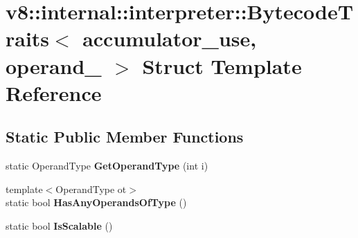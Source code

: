 \hypertarget{structv8_1_1internal_1_1interpreter_1_1_bytecode_traits_3_01accumulator__use_00_01operand__0_01_4}{}\section{v8\+:\+:internal\+:\+:interpreter\+:\+:Bytecode\+Traits$<$ accumulator\+\_\+use, operand\+\_ $>$ Struct Template Reference}
\label{structv8_1_1internal_1_1interpreter_1_1_bytecode_traits_3_01accumulator__use_00_01operand__0_01_4}
\subsection*{Static Public Member Functions}
\begin{DoxyCompactItemize}
\item 
static Operand\+Type {\bfseries Get\+Operand\+Type} (int i)\hypertarget{structv8_1_1internal_1_1interpreter_1_1_bytecode_traits_3_01accumulator__use_00_01operand__0_01_4_a90b60251aa2a39b26f923ed2ba91f692}{}\label{structv8_1_1internal_1_1interpreter_1_1_bytecode_traits_3_01accumulator__use_00_01operand__0_01_4_a90b60251aa2a39b26f923ed2ba91f692}

\item 
{\footnotesize template$<$Operand\+Type ot$>$ }\\static bool {\bfseries Has\+Any\+Operands\+Of\+Type} ()\hypertarget{structv8_1_1internal_1_1interpreter_1_1_bytecode_traits_3_01accumulator__use_00_01operand__0_01_4_ae061e6417d1d085d25716c213a7ae28f}{}\label{structv8_1_1internal_1_1interpreter_1_1_bytecode_traits_3_01accumulator__use_00_01operand__0_01_4_ae061e6417d1d085d25716c213a7ae28f}

\item 
static bool {\bfseries Is\+Scalable} ()\hypertarget{structv8_1_1internal_1_1interpreter_1_1_bytecode_traits_3_01accumulator__use_00_01operand__0_01_4_a4e12934658dee00e5b6d256c499ae02e}{}\label{structv8_1_1internal_1_1interpreter_1_1_bytecode_traits_3_01accumulator__use_00_01operand__0_01_4_a4e12934658dee00e5b6d256c499ae02e}

\end{DoxyCompactItemize}
